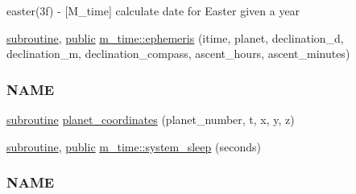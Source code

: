 \begin{DoxyCompactItemize}
\begin{DoxyCompactList}
easter(3f) -\/ \mbox{[}M\+\_\+time\mbox{]} calculate date for Easter given a year \end{DoxyCompactList}\item 
\hyperlink{M__stopwatch_83_8txt_acfbcff50169d691ff02d4a123ed70482}{subroutine}, \hyperlink{M__stopwatch_83_8txt_a2f74811300c361e53b430611a7d1769f}{public} \hyperlink{namespacem__time_a915b29d3b8abeeb7455eb5d6eed28790}{m\+\_\+time\+::ephemeris} (itime, planet, declination\+\_\+d, declination\+\_\+m, declination\+\_\+compass, ascent\+\_\+hours, ascent\+\_\+minutes)
\begin{DoxyCompactList}\small\item\em \subsubsection*{N\+A\+ME}\end{DoxyCompactList}\item 
\hyperlink{M__stopwatch_83_8txt_acfbcff50169d691ff02d4a123ed70482}{subroutine} \hyperlink{M__time_8f90_a7d6b522799e158810bf530a1dedbc03e}{planet\+\_\+coordinates} (planet\+\_\+number, t, x, y, z)
\item 
\hyperlink{M__stopwatch_83_8txt_acfbcff50169d691ff02d4a123ed70482}{subroutine}, \hyperlink{M__stopwatch_83_8txt_a2f74811300c361e53b430611a7d1769f}{public} \hyperlink{namespacem__time_a7c5d028ae1e1e01162ffc7bb55dcbbb1}{m\+\_\+time\+::system\+\_\+sleep} (seconds)
\begin{DoxyCompactList}\small\item\em \subsubsection*{N\+A\+ME}


\end{DoxyCompactList}
\end{DoxyCompactItemize}

